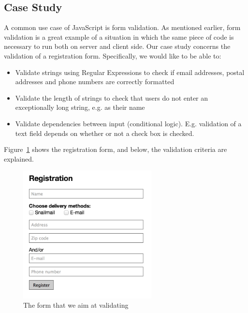 	\subsection{Case Study}
		A common use case of JavaScript is form validation. As mentioned earlier, form validation is a great example of a situation in which the same piece of code is necessary to run both on server and client side. Our case study concerns the validation of a registration form. Specifically, we would like to be able to:

		\begin{itemize}
			\item Validate strings using Regular Expressions to check if email addresses, postal addresses and phone numbers are correctly formatted
			\item Validate the length of strings to check that users do not enter an exceptionally long string, e.g. as their name
			\item Validate dependencies between input (conditional logic). E.g. validation of a text field depends on whether or not a check box is checked.
		\end{itemize}

		Figure~\ref{registrationForm} shows the registration form, and below, the validation criteria are explained.

		\begin{figure}
			\begin{center}
				\centerline{\includegraphics[width=7cm]{resources/images/registrationform.png}}
			\end{center}
			\caption{The form that we aim at validating}
			\label{registrationForm}
		\end{figure}

